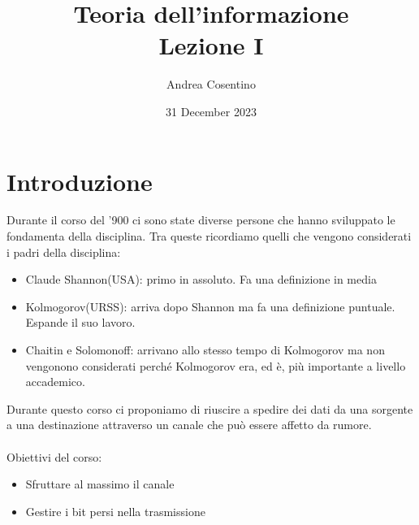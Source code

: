 \documentclass{article}
\title{Teoria dell'informazione\\Lezione I}
\author{Andrea Cosentino}
\date{31 December 2023}
\begin{document}
    \maketitle

    \section{Introduzione}

    Durante il corso del '900 ci sono state diverse persone che hanno sviluppato le fondamenta della disciplina. Tra queste ricordiamo quelli che vengono considerati i padri della disciplina:
    \begin{itemize}
        \item Claude Shannon(USA): primo in assoluto. Fa una definizione in media
        \item Kolmogorov(URSS): arriva dopo Shannon ma fa una definizione puntuale. Espande il suo lavoro.
        \item Chaitin e Solomonoff: arrivano allo stesso tempo di Kolmogorov ma non vengonono considerati perché Kolmogorov era, ed è, più importante a livello accademico.
    \end{itemize}
    \vspace{10px}
    Durante questo corso ci proponiamo di riuscire a spedire dei dati da una sorgente a una destinazione
    attraverso un canale che può essere affetto da rumore.
    \\ \\
    Obiettivi del corso:
    \begin{itemize}
        \item{Sfruttare al massimo il canale}
        \item{Gestire i bit persi nella trasmissione}
    \end{itemize}
    \vspace{10px}
\end{document}
